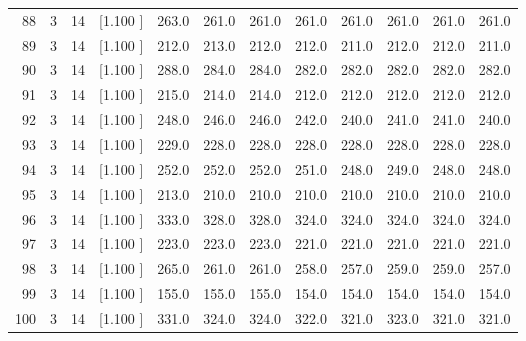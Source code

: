 \documentclass[12pt,a4paper]{article}
\begin{document}
\begin{center}
{\begin{tabular}{r r r r r r r r r r r r}
  88&  3& 14&[1.100     ]&   263.0&   261.0&   261.0&   261.0&   261.0&   261.0&   261.0&   261.0\\[-0.02in]
  89&  3& 14&[1.100     ]&   212.0&   213.0&   212.0&   212.0&   211.0&   212.0&   212.0&   211.0\\[-0.02in]
  90&  3& 14&[1.100     ]&   288.0&   284.0&   284.0&   282.0&   282.0&   282.0&   282.0&   282.0\\[-0.02in]
  91&  3& 14&[1.100     ]&   215.0&   214.0&   214.0&   212.0&   212.0&   212.0&   212.0&   212.0\\[-0.02in]
  92&  3& 14&[1.100     ]&   248.0&   246.0&   246.0&   242.0&   240.0&   241.0&   241.0&   240.0\\[-0.02in]
  93&  3& 14&[1.100     ]&   229.0&   228.0&   228.0&   228.0&   228.0&   228.0&   228.0&   228.0\\[-0.02in]
  94&  3& 14&[1.100     ]&   252.0&   252.0&   252.0&   251.0&   248.0&   249.0&   248.0&   248.0\\[-0.02in]
  95&  3& 14&[1.100     ]&   213.0&   210.0&   210.0&   210.0&   210.0&   210.0&   210.0&   210.0\\[-0.02in]
  96&  3& 14&[1.100     ]&   333.0&   328.0&   328.0&   324.0&   324.0&   324.0&   324.0&   324.0\\[-0.02in]
  97&  3& 14&[1.100     ]&   223.0&   223.0&   223.0&   221.0&   221.0&   221.0&   221.0&   221.0\\[-0.02in]
  98&  3& 14&[1.100     ]&   265.0&   261.0&   261.0&   258.0&   257.0&   259.0&   259.0&   257.0\\[-0.02in]
  99&  3& 14&[1.100     ]&   155.0&   155.0&   155.0&   154.0&   154.0&   154.0&   154.0&   154.0\\[-0.02in]
 100&  3& 14&[1.100     ]&   331.0&   324.0&   324.0&   322.0&   321.0&   323.0&   321.0&   321.0\\[-0.02in]

\hline
\end{tabular}}
\end{center}
\end{document}
